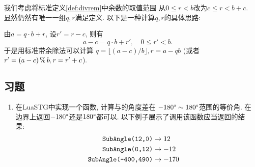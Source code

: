 我们考虑将标准定义\ref{def:divrem}中余数的取值范围
从$0 \le r < b$改为$c \le r < b+c$.
显然仍然有唯一一组$q,r$满足定义.
以下是一种计算$q,r$的具体思路:

由$a = q \cdot b + r$, 设$r' = r - c$, 则有
\[
  a - c = q \cdot b + r',\quad
  0 \le r' < b.
\]
于是用标准带余除法可以计算
$q = \lfloor{(a-c)/b}\rfloor, r = a - qb$
(或者$r' = (a-c) \operatorname{\%} b, r = r' + c$).

\subsection*{习题}

\begin{enumerate}
  \item \comment{*}
        在LuaSTG中实现一个函数,
        计算与的角度差在
        $-180\degree \sim 180\degree$范围的等价角.
        在边界上返回$-180\degree$还是$180\degree$都可以.
        以下例子展示了调用该函数应当返回的结果:
        \begin{align*}
          \texttt{SubAngle(12,0)}     & \to 12   \\
          \texttt{SubAngle(0,12)}     & \to -12  \\
          \texttt{SubAngle(-400,490)} & \to -170 \\
        \end{align*}




\end{enumerate}
